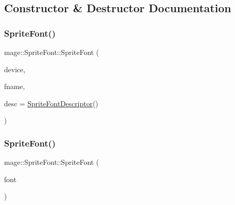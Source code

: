 \subsection{Constructor \& Destructor Documentation}
\hypertarget{classmage_1_1_sprite_font_ae9aaa257b25968d4681140c1594fc334}{}\label{classmage_1_1_sprite_font_ae9aaa257b25968d4681140c1594fc334} 
\subsubsection{\texorpdfstring{Sprite\+Font()}{SpriteFont()}\hspace{0.1cm}{\footnotesize\ttfamily [1/3]}}
{\footnotesize\ttfamily mage\+::\+Sprite\+Font\+::\+Sprite\+Font (\begin{DoxyParamCaption}\item[{I\+D3\+D11\+Device2 $\ast$}]{device,  }\item[{const wstring \&}]{fname,  }\item[{const \hyperlink{structmage_1_1_sprite_font_descriptor}{Sprite\+Font\+Descriptor} \&}]{desc = {\ttfamily \hyperlink{structmage_1_1_sprite_font_descriptor}{Sprite\+Font\+Descriptor}()} }\end{DoxyParamCaption})\hspace{0.3cm}{\ttfamily [explicit]}}

\hypertarget{classmage_1_1_sprite_font_a5df751fe06abda25127fdd9222e41948}{}\label{classmage_1_1_sprite_font_a5df751fe06abda25127fdd9222e41948} 
\subsubsection{\texorpdfstring{Sprite\+Font()}{SpriteFont()}\hspace{0.1cm}{\footnotesize\ttfamily [2/3]}}
{\footnotesize\ttfamily mage\+::\+Sprite\+Font\+::\+Sprite\+Font (\begin{DoxyParamCaption}\item[{const \hyperlink{classmage_1_1_sprite_font}{Sprite\+Font} \&}]{font }\end{DoxyParamCaption})\hspace{0.3cm}{\ttfamily [delete]}}

\hypertarget{classmage_1_1_sprite_font_ad04b6470c6cf226703c0bb6ccb5dc31a}{}\label{classmage_1_1_sprite_font_ad04b6470c6cf226703c0bb6ccb5dc31a} 
